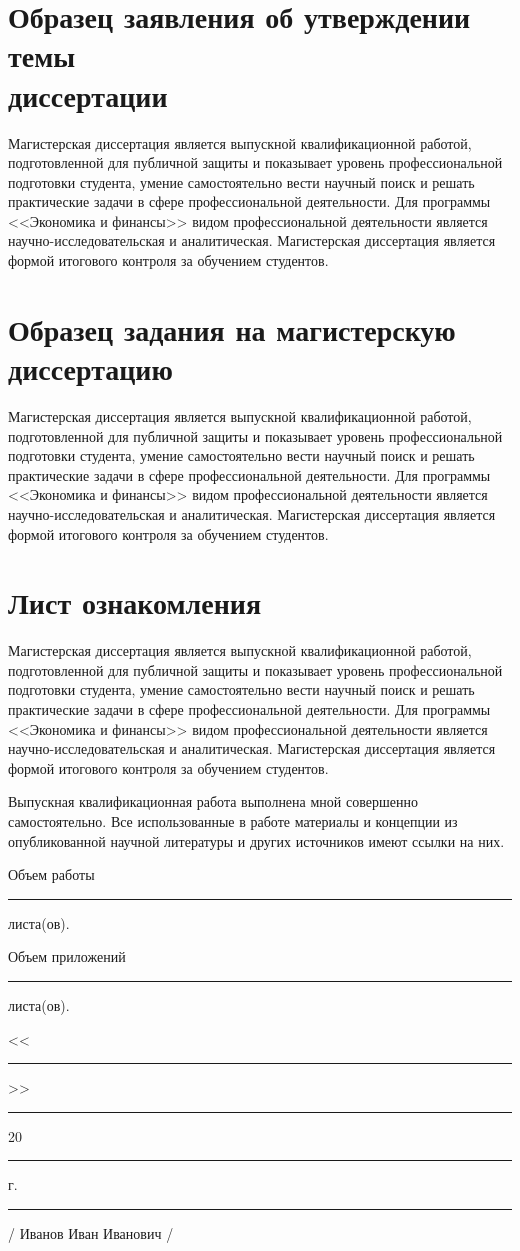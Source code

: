 \documentclass[12pt,a4paper, oneside]{extreport}
\begin{document}
\chapter[Образец заявления об утверждении темы диссертации]{Образец заявления об утверждении темы\\ диссертации}

Магистерская диссертация является выпускной квалификационной работой, подготовленной для публичной защиты и показывает уровень профессиональной подготовки студента, умение самостоятельно вести научный поиск и решать практические задачи в сфере профессиональной деятельности. Для программы <<Экономика и финансы>> видом профессиональной деятельности является научно-исследовательская и аналитическая. Магистерская диссертация является формой итогового контроля за обучением студентов.


\chapter[Образец задания на магистерскую диссертацию]{Образец задания на магистерскую\\ диссертацию}

Магистерская диссертация является выпускной квалификационной работой, подготовленной для публичной защиты и показывает уровень профессиональной подготовки студента, умение самостоятельно вести научный поиск и решать практические задачи в сфере профессиональной деятельности. Для программы <<Экономика и финансы>> видом профессиональной деятельности является научно-исследовательская и аналитическая. Магистерская диссертация является формой итогового контроля за обучением студентов.


\chapter[Лист ознакомления]{Лист ознакомления}

Магистерская диссертация является выпускной квалификационной работой, подготовленной для публичной защиты и показывает уровень профессиональной подготовки студента, умение самостоятельно вести научный поиск и решать практические задачи в сфере профессиональной деятельности. Для программы <<Экономика и финансы>> видом профессиональной деятельности является научно-исследовательская и аналитическая. Магистерская диссертация является формой итогового контроля за обучением студентов.


\newpage
\thispagestyle{empty}


Выпускная квалификационная работа выполнена мной совершенно самостоятельно. Все использованные в работе материалы и концепции из опубликованной научной литературы и других источников имеют ссылки на них.

\vspace{2ex}

 Объем работы  \rule{2em}{0.5pt} листа(ов).

\vspace{2ex}

 Объем приложений \rule{2em}{0.5pt} листа(ов).

\vspace{4ex}

\noindent << \rule{1em}{0.5pt} >> \rule{5em}{0.5pt} 20 \rule{1.4em}{0.5pt} г.

\vspace{4ex}

\noindent \rule{11em}{0.5pt} \hspace{8em} / Иванов Иван Иванович /
\end{document}
